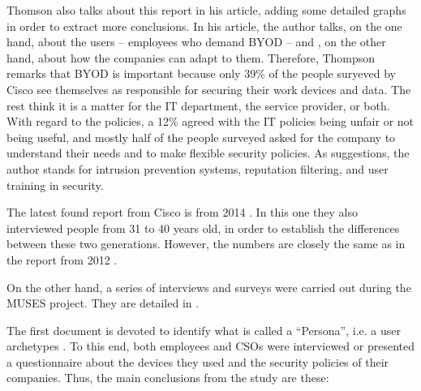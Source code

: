 Thomson \cite{thomson2012byod} also talks about this report in his article, adding some detailed graphs in order to extract more conclusions. In his article, the author talks, on the one hand, about the users -- employees who demand BYOD -- and , on the other hand, about how the companies can adapt to them. Therefore, Thompson remarks that BYOD is important because only 39\% of the people suryeved by Cisco see themselves as responsible for securing their work devices and data. The rest think it is a matter for the IT department, the service provider, or both. With regard to the policies, a 12\% agreed with the IT policies being unfair or not being useful, and mostly half of the people surveyed asked for the company to understand their needs and to make flexible security policies. As suggestions, the author stands for intrusion prevention systems, reputation filtering, and user training in security.

The latest found report from Cisco is from 2014 \cite{cisco2014}. In this one they also interviewed people from 31 to 40 years old, in order to establish the differences between these two generations. However, the numbers are closely the same as in the report from 2012 \cite{cisco2012}.

On the other hand, a series of interviews and surveys were carried out during the MUSES project. They are detailed in \cite{musesD41, musesD42}.

The first document is devoted to identify what is called a ``Persona'', i.e. a user archetypes \cite{adlin2010essential}. To this end, both employees and CSOs were interviewed or presented a questionnaire about the devices they used and the security policies of their companies. Thus, the main conclusions from the study are these:

